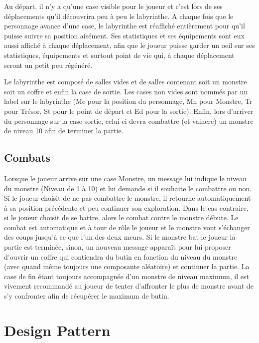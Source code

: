 \documentclass[a4paper]{article}
\begin{document}
Au départ, il n'y a qu'une case visible pour le joueur et c'est lors de ses déplacements qu'il découvrira peu à peu le labyrinthe.
A chaque fois que le personnage avance d'une case, le labyrinthe est réaffiché entièrement pour qu'il puisse suivre sa position aisément.
Ses statistiques et ses équipements sont eux aussi affiché à chaque déplacement, afin que le joueur puisse garder un oeil sur ses statistiques, équipements et surtout point de vie qui, à chaque déplacement seront un petit peu régénéré.

Le labyrinthe est composé de salles vides et de salles contenant soit un monstre soit un coffre et enfin la case de sortie.
Les cases non vides sont nommés par un label sur le labyrinthe (Me pour la position du personnage, Mn pour Monstre, Tr pour Trésor, St pour le point de départ et Ed pour la sortie).
Enfin, lors d'arriver du personnage sur la case sortie, celui-ci devra combattre (et vaincre) un monstre de niveau 10 afin de terminer la partie.


    \subsection{Combats}

Lorsque le joueur arrive sur une case Monstre, un message lui indique le niveau du monstre (Niveau de 1 à 10) et lui demande si il souhaite le combattre ou non.
Si le joueur choisit de ne pas combattre le monstre, il retourne automatiquement à sa position précédente et peu continuer son exploration.
Dans le cas contraire, si le joueur choisit de se battre, alors le combat contre le monstre débute.
Le combat est automatique et à tour de rôle le joueur et le monstre vont s'échanger des coups jusqu'à ce que l'un des deux meurs.
Si le monstre bat le joueur la partie est terminée, sinon, un nouveau message apparaît pour lui proposer d'ouvrir un coffre qui contiendra du butin en fonction du niveau du monstre (avec quand même toujours une composante aléatoire) et continuer la partie.
La case de fin étant toujours accompagnée d'un monstre de niveau maximum, il est vivement recommandé au joueur de tenter d'affronter le plus de monstre avant de s'y confronter afin de récupérer le maximum de butin.

  \newpage
  \section{Design Pattern}
\end{document}
